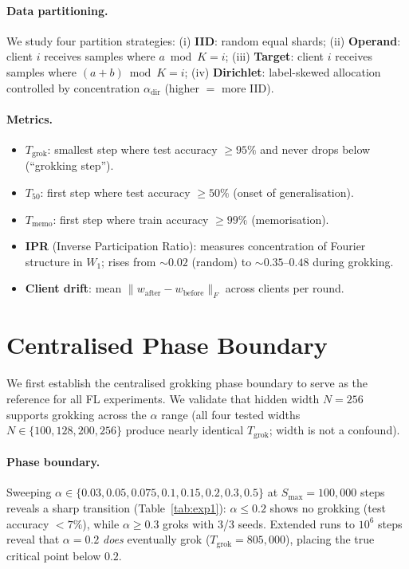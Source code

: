 \documentclass{article}
\begin{document}
\paragraph{Data partitioning.}
We study four partition strategies:
(i) \textbf{IID}: random equal shards;
(ii) \textbf{Operand}: client $i$ receives samples where $a \bmod K = i$;
(iii) \textbf{Target}: client $i$ receives samples where $(a+b) \bmod K = i$;
(iv) \textbf{Dirichlet}: label-skewed allocation controlled by concentration $\alpha_{\mathrm{dir}}$ (higher $= $ more IID).

\paragraph{Metrics.}
\begin{itemize}
  \item $T_{\mathrm{grok}}$: smallest step where test accuracy $\geq 95\%$ and never drops below (``grokking step'').
  \item $T_{50}$: first step where test accuracy $\geq 50\%$ (onset of generalisation).
  \item $T_{\mathrm{memo}}$: first step where train accuracy $\geq 99\%$ (memorisation).
  \item \textbf{IPR} (Inverse Participation Ratio): measures concentration of Fourier structure in $W_1$; rises from ${\sim}0.02$ (random) to ${\sim}0.35$--$0.48$ during grokking.
  \item \textbf{Client drift}: mean $\|w_{\mathrm{after}} - w_{\mathrm{before}}\|_F$ across clients per round.
\end{itemize}


\section{Centralised Phase Boundary}
\label{sec:boundary}

We first establish the centralised grokking phase boundary to serve as the reference for all FL experiments.
We validate that hidden width $N = 256$ supports grokking across the $\alpha$ range (all four tested widths $N \in \{100, 128, 200, 256\}$ produce nearly identical $T_{\mathrm{grok}}$; width is not a confound).

\paragraph{Phase boundary.}
Sweeping $\alpha \in \{0.03, 0.05, 0.075, 0.1, 0.15, 0.2, 0.3, 0.5\}$ at $S_{\max} = 100{,}000$ steps reveals a sharp transition (Table~\ref{tab:exp1}): $\alpha \leq 0.2$ shows no grokking (test accuracy $< 7\%$), while $\alpha \geq 0.3$ groks with 3/3 seeds.
Extended runs to $10^6$ steps reveal that $\alpha = 0.2$ \emph{does} eventually grok ($T_{\mathrm{grok}} = 805{,}000$), placing the true critical point below $0.2$.
\end{document}
